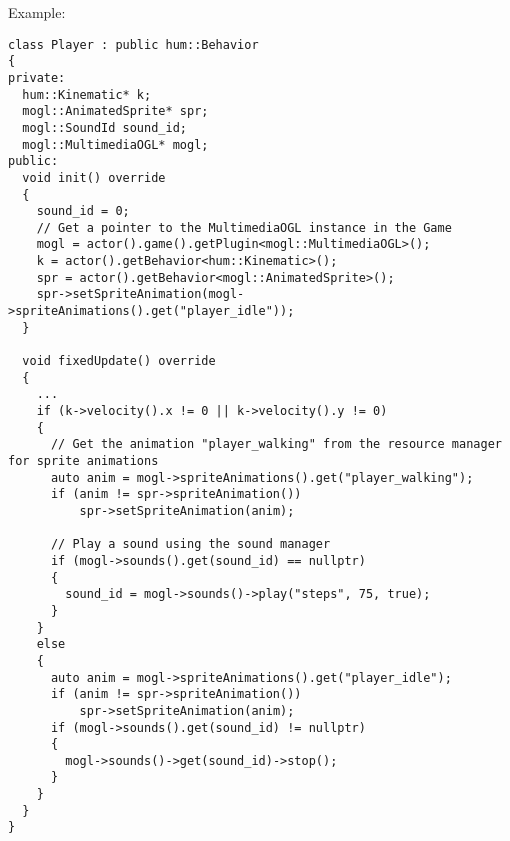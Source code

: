Example:
\begin{lstlisting}[caption=MultimediaOGL example]
class Player : public hum::Behavior
{
private:
  hum::Kinematic* k;
  mogl::AnimatedSprite* spr;
  mogl::SoundId sound_id;
  mogl::MultimediaOGL* mogl;
public:
  void init() override
  {
    sound_id = 0;
    // Get a pointer to the MultimediaOGL instance in the Game
    mogl = actor().game().getPlugin<mogl::MultimediaOGL>();
    k = actor().getBehavior<hum::Kinematic>();
    spr = actor().getBehavior<mogl::AnimatedSprite>();
    spr->setSpriteAnimation(mogl->spriteAnimations().get("player_idle"));
  }

  void fixedUpdate() override
  {
    ...
    if (k->velocity().x != 0 || k->velocity().y != 0)
    {
      // Get the animation "player_walking" from the resource manager for sprite animations
      auto anim = mogl->spriteAnimations().get("player_walking");
      if (anim != spr->spriteAnimation())
          spr->setSpriteAnimation(anim);

      // Play a sound using the sound manager
      if (mogl->sounds().get(sound_id) == nullptr)
      {
        sound_id = mogl->sounds()->play("steps", 75, true);
      }
    }
    else
    {
      auto anim = mogl->spriteAnimations().get("player_idle");
      if (anim != spr->spriteAnimation())
          spr->setSpriteAnimation(anim);
      if (mogl->sounds().get(sound_id) != nullptr)
      {
        mogl->sounds()->get(sound_id)->stop();
      }
    }
  }
}
\end{lstlisting}
